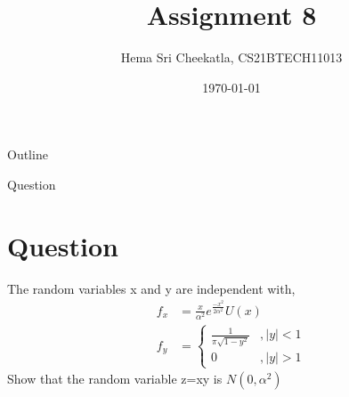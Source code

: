 \documentclass{beamer}
\title{Assignment 8}
\author{Hema Sri Cheekatla, CS21BTECH11013}
\date{\today}
\theoremstyle{remark}
\numberwithin{equation}{subsection}
\begin{document}
\begin{frame}
    \titlepage 
\end{frame}

\logo{}


\begin{frame}{Outline}
    \tableofcontents
\end{frame}

\begin{frame}{Question}
    \section{Question}
    The random variables x and y are independent with,\newline
    \begin{align}
        f_x &=  \frac{x}{\alpha^2}e^{\frac{-x^2}{2\alpha^2}}U(x) \\
        f_y &= \begin{cases} \frac{1}{\pi \sqrt{1 - y^2}} &, |y| < 1 \\
            0 &, |y| > 1 \end{cases} 
    \end{align}
    Show that the random variable z=xy is $N(0, \alpha^2)$
\end{frame}
\end{document}
